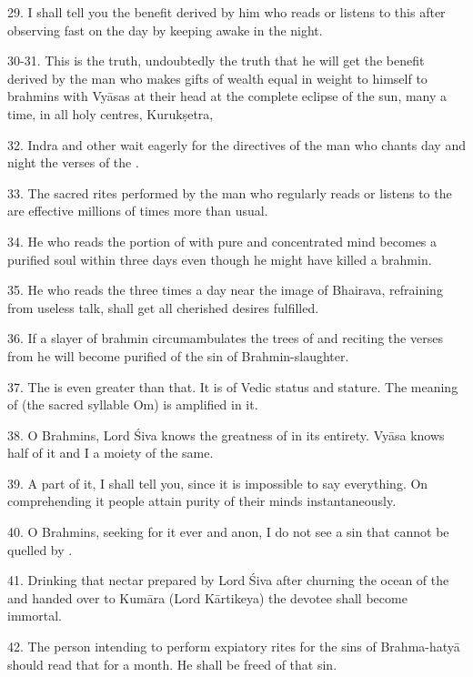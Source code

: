 29. I shall tell you the benefit derived by him who reads or listens to this
after observing fast on the  day by keeping awake in the night.

30-31. This is the truth, undoubtedly the truth that he will get the benefit
derived by the man who makes gifts of wealth equal in weight to himself to
brahmins with Vyāsas at their head at the complete eclipse of the sun, many
a time, in all holy centres, Kurukṣetra, \etc

32. Indra and other  wait eagerly for the directives of the man who
chants day and night the verses of the .

33. The sacred rites performed by the man who regularly reads or listens to
the  are effective millions of times more than usual.

34. He who reads the  portion of  with pure and
concentrated mind becomes a purified soul within three days even though he might
have killed a brahmin.

35. He who reads the  three times a day near the image of
Bhairava, refraining from useless talk, shall get all cherished desires
fulfilled.

36. If a slayer of brahmin circumambulates the trees of  and 
reciting the verses from  he will become purified of the sin of
Brahmin-slaughter.

37. The  is even greater than that. It is of Vedic status
and stature. The meaning of  (the sacred syllable Om) is amplified
in it.

38. O Brahmins, Lord Śiva knows the greatness of  in its
entirety. Vyāsa knows half of it and I a moiety of the same.

39. A part of it, I shall tell you, since it is impossible to say everything.
On comprehending it people attain purity of their minds instantaneously.

40. O Brahmins, seeking for it ever and anon, I do not see a sin that cannot be
quelled by .

41. Drinking that nectar prepared by Lord Śiva after churning the ocean of
the  and handed over to Kumāra (Lord Kārtikeya) the devotee shall
become immortal.

42. The person intending to perform expiatory rites for the sins of Brahma-hatyā
\etc should read that  for a month. He shall be freed of that sin.

